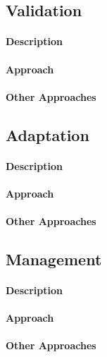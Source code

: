 \subsection{Validation} %
\label{sec:validation}

\paragraph{Description}
\paragraph{Approach}
\paragraph{Other Approaches}

\subsection{Adaptation} %
\label{sec:adaptation}

\paragraph{Description}
\paragraph{Approach}
\paragraph{Other Approaches}

\subsection{Management} %
\label{sec:management}

\paragraph{Description}
\paragraph{Approach}
\paragraph{Other Approaches}
